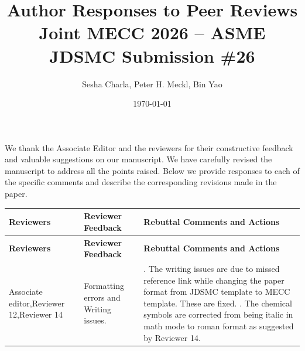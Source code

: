 \documentclass[letterpaper, 11pt]{article}
\title{Author Responses to Peer Reviews \\ \large Joint MECC 2026 -- ASME JDSMC Submission \#26}
\author{Sesha Charla, Peter H. Meckl, Bin Yao}
\date{\today}
\begin{document}
\maketitle

We thank the Associate Editor and the reviewers for their constructive feedback and valuable suggestions on our
manuscript. We have carefully revised the manuscript to address all the points raised. Below we provide responses to
each of the specific comments and describe the corresponding revisions made in the paper.

\renewcommand{\arraystretch}{1.3}
\begin{longtable}{>{\raggedright\arraybackslash}p{}>{\raggedright\arraybackslash}p{}>{\raggedright\arraybackslash}p{}}
    \toprule
    \textbf{Reviewers}                                                                                                                       &
    \textbf{Reviewer Feedback}                                                                                                               &
    \textbf{Rebuttal Comments and Actions}                                                                                                     \\ \midrule
    \endfirsthead
    \toprule
    \textbf{Reviewers}                                                                                                                       &
    \textbf{Reviewer Feedback}                                                                                                               &
    \textbf{Rebuttal Comments and Actions}                                                                                                     \\ \midrule
    \endhead
    \bottomrule
    \endfoot
    Associate editor,\newline Reviewer 12,\newline Reviewer 14                                                                               &
    Formatting errors and Writing issues.                                                                                                    &
    1. The writing issues are due to missed reference link while changing the paper format from JDSMC template to MECC template. These are fixed. \newline
    2. The chemical symbols are corrected from being italic in math mode to roman format as suggested by Reviewer 14.                          \\ \midrule

\end{longtable}
\end{document}
